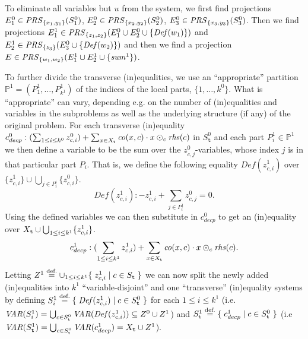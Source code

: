 \begin{example}
To eliminate all variables but $u$ %
from the system, we first find projections $E^0_1\in \mathit{PRS}_{\{x_1, y_1\}}(S^0_1)$, $E^0_2\in \mathit{PRS}_{\{x_2, y_2\}}(S^0_2)$, $E^0_3\in \mathit{PRS}_{\{x_3, y_3\}}(S^0_3)$. Then we find projections $E^1_1\in \prs_{\{z_1,z_2\}}(E^0_1\cup E^0_2\cup %
\{\mi{Def}(w_1)\})$ and $E^1_2\in \prs_{\{z_3\}}(E^0_3\cup %
\{\mi{Def}(w_2)\})$ and then we find a projection $E\in \mathit{PRS}_{\{w_1, w_2\}}(E^1_1\cup E^1_2 \cup \{\mathit{sum}^1\})$.%
\end{example}
%
To further divide the transverse (in)equalities, we use an ``appropriate'' partition $\mathbb{P}^1 = (P^1_1, \ldots, P^1_{k^1})$ of the indices of the local parts, $\{1,\ldots, k^0\}$.
What is ``appropriate'' can vary, depending e.g. on the number of (in)equalities and variables in the subproblems as well as the underlying structure (if any) of the original problem. %
For each transverse (in)equality $c^0_{decp}:(\sum_{1\leq i \leq k^0}z^0_{c,i}) + \sum_{x\in X_{\texttt{t}}}\mathit{co}(x,c)\cdot x
\odot_{c}\mathit{rhs}(c)$ in $S^0_\texttt{t}$ and each part $P^1_i\in \mathbb{P}^1$ we then define a variable to be the sum over the $z^0_{c,j}$-variables, whose index $j$ is in that particular part $P_i$. That is, we define the following equality $\mathit{Def}(z_{c,i}^1)$ over $\{z^1_{c,i}\}\cup\bigcup_{j\in P^i_i}\{z^0_{c,i}\}$.
\begin{equation}\label{eq:z1}
\mathit{Def}(z_{c,i}^1): -z_{c,i}^1 + \sum_{j\in P_i^1} z_{c,j}^{0} = 0.
\end{equation}
%
Using the defined variables we can then substitute in $c^0_{decp}$ to get an (in)equality over $X_{\texttt{t}}\cup\bigcup_{1\leq i\leq k^1}\{z^1_{c,i}\}$.
\[
c_{decp}^1: (\sum_{1\leq i\leq k^1} z^1_{c,i}) + \sum_{x\in X_{\texttt{t}}}\mathit{co}(x,c)\cdot x \odot_c \mathit{rhs}(c).
\]
Letting $Z^1 \overset{\text{def.}}= \cup_{1\leq i\leq k^1}\{\;{z^1_{c,i}}\;|\;{c\in S_{\texttt{t}}}\;\}$ we can now split the newly added (in)equalities into $k^1$ ``variable-disjoint'' and one ``transverse'' (in)equality systems by defining $S^1_i\overset{\text{def.}}=\{\;{\mathit{Def}(z^1_{c,i})}\;|\;{c\in S^0_\texttt{t}}\;\}$ for each $1\leq i\leq k^1$ (i.e. $\mathit{VAR}(S^1_i) = \bigcup_{c\in S^0_{\texttt{t}}}\mathit{VAR}(\mathit{Def}(z^1_{c,i}))\subseteq Z^0\cup Z^1$) and $S^1_\texttt{t} \overset{\text{def.}}= \{\;{c_{decp}^1}\;|\;{c\in S^0_\texttt{t}}\;\}$ (i.e $\mathit{VAR}(S^1_{\texttt{t}}) = \bigcup_{c\in S^0_{\texttt{t}}}\mathit{VAR}(c^1_{decp}) = X_{\texttt{t}}\cup Z^1$).

